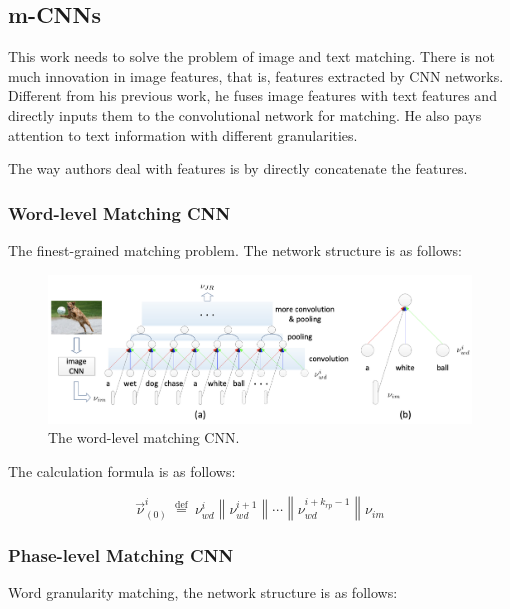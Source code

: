 \subsection{m-CNNs}

This work \cite{ma2015multimodal} needs to solve the problem of image and text matching. There is not much innovation in image features, that is, features extracted by CNN networks. Different from his previous work, he fuses image features with text features and directly inputs them to the convolutional network for matching. He also pays attention to text information with different granularities.

The way authors deal with features is by directly concatenate the features.

\subsubsection{Word-level Matching CNN}
The finest-grained matching problem. The network structure is as follows:

\begin{figure}[h!]
\centering
\includegraphics[width=\textwidth]{mccns1.pdf}
\caption{The word-level matching CNN. \cite{ma2015multimodal}}
\label{fig:mccns1}
\end{figure}

The calculation formula is as follows:

$$
\vec{\nu}_{(0)}^{i} \stackrel{\text { def }}{=} \nu_{w d}^{i}\left\|\nu_{w d}^{i+1}\right\| \cdots\left\|\nu_{w d}^{i+k_{r p}-1}\right\| \nu_{i m}
$$

\subsubsection{Phase-level Matching CNN}
Word granularity matching, the network structure is as follows:

